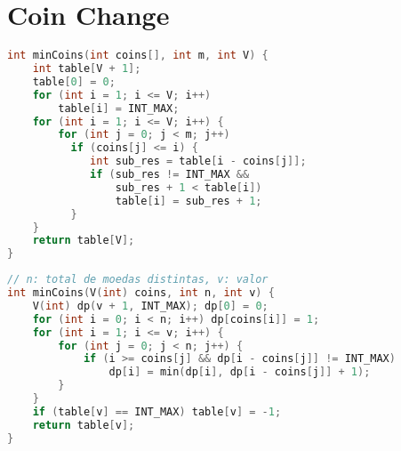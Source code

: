 \newpage

\section{Coin Change}
\begin{lstlisting}[language = C++, title={Versão 1}]
int minCoins(int coins[], int m, int V) {
    int table[V + 1];
    table[0] = 0;
    for (int i = 1; i <= V; i++)
        table[i] = INT_MAX;
    for (int i = 1; i <= V; i++) {
        for (int j = 0; j < m; j++)
          if (coins[j] <= i) {
             int sub_res = table[i - coins[j]];
             if (sub_res != INT_MAX && 
             	 sub_res + 1 < table[i])
                 table[i] = sub_res + 1;
          }
    }
    return table[V];
}
\end{lstlisting}

\newpage

\begin{lstlisting}[language = C++, title={Versão Reduzida}]
// n: total de moedas distintas, v: valor
int minCoins(V(int) coins, int n, int v) {
	V(int) dp(v + 1, INT_MAX); dp[0] = 0;
    for (int i = 0; i < n; i++) dp[coins[i]] = 1;
    for (int i = 1; i <= v; i++) {
    	for (int j = 0; j < n; j++) {
        	if (i >= coins[j] && dp[i - coins[j]] != INT_MAX)
            	dp[i] = min(dp[i], dp[i - coins[j]] + 1);
        }
    }
    if (table[v] == INT_MAX) table[v] = -1;
    return table[v];
}
\end{lstlisting}